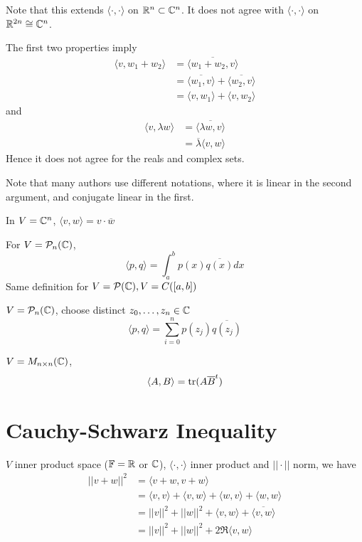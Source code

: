 \documentclass[12pt]{article}
\begin{document}
Note that this extends $\langle \cdot,\cdot \rangle$ on $\mathbb{R}^n\subset\mathbb{C}^n$. It does not agree with $\langle \cdot,\cdot \rangle$ on $\mathbb{R}^{2n}\cong\mathbb{C}^n$.

\begin{ex}
	The first two properties imply
	\begin{align*}
		\langle v,w_1+w_2 \rangle &= \overline{\langle w_1+w_2, v \rangle} \\
					  &= \overline{\langle w_1,v \rangle} + \overline{\langle w_2, v\rangle} \\
					  &= \langle v,w_1 \rangle + \langle v,w_2 \rangle
	\end{align*}
	and
	\begin{align*}
		\langle v,\lambda w \rangle &= \overline{\langle \lambda w,v \rangle} \\
					    &= \overline{\lambda} \langle v,w \rangle
	\end{align*}
	Hence it does not agree for the reals and complex sets.
\end{ex}

Note that many authors use different notations, where it is linear in the second argument, and conjugate linear in the first.

\begin{ex}
	In $V=\mathbb{C}^n$, $\langle v,w \rangle = v\cdot\overline{w}$
\end{ex}

\begin{ex}
	For $V=\mathcal{P}_n(\mathbb{C})$,
	$$\langle p,q \rangle = \int_a^b p(x)\overline{q(x)}dx$$
	Same definition for $V=\mathcal{P}(\mathbb{C}), V = C([a,b])$
\end{ex}

\begin{ex}
	$V = \mathcal{P}_n(\mathbb{C})$, choose distinct $z_0,\dots,z_n \in \mathbb{C}$
	$$\langle p,q \rangle = \sum_{i=0}^n p(z_j)\overline{q(z_j)}$$
\end{ex}

\begin{ex}
	$V = M_{n\times n}(\mathbb{C})$,
	$$\langle A,B \rangle = \operatorname{tr}(A\overline{B}^t)$$
\end{ex}

\section{Cauchy-Schwarz Inequality}

$V$ inner product space ($\mathbb{F}=\mathbb{R}$ or $\mathbb{C}$), $\langle \cdot,\cdot \rangle$ inner product and $||\cdot||$ norm, we have
\begin{align*}
	||v+w||^2 &= \langle v+w, v+w \rangle \\
		  &= \langle v,v \rangle + \langle v,w \rangle + \langle w,v \rangle + \langle w,w \rangle \\
		  &= ||v||^2 + ||w||^2 + \langle v,w \rangle + \overline{\langle v,w \rangle} \\
		  &= ||v||^2 + ||w||^2 + 2\Re\langle v,w \rangle
\end{align*}
\end{document}
